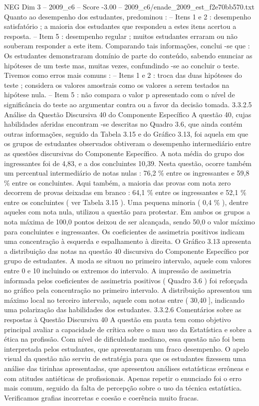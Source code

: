 \begin{textsample}{NEG Dim 3 – 2009\_c6 – Score -3.00 – 2009\_c6/enade\_2009\_est\_f2e70bb570.txt}
Quanto ao desempenho dos estudantes, predominou : – Itens 1 e 2 : desempenho satisfatório ; a maioria dos estudantes que respondeu a estes itens acertou a resposta. – Item 5 : desempenho regular ; muitos estudantes erraram ou não souberam responder a este item.
Comparando tais informações, conclui -se que : Os estudantes demonstraram domínio de parte do conteúdo, sabendo enunciar as hipóteses de um teste mas, muitas vezes, confundindo -se ao concluir o teste.
Tivemos como erros mais comuns : – Itens 1 e 2 : troca das duas hipóteses do teste ; considera os valores amostrais como os valores a serem testados na hipótese nula. – Item 5 : não compara o valor p apresentado com o nível de significância do teste ao argumentar contra ou a favor da decisão tomada. 3.3.2.5 Análise da Questão Discursiva 40 do Componente Específico A questão 40, cujas habilidades aferidas encontram -se descritas no Quadro 3.6, que ainda contém outras informações, seguido da Tabela 3.15 e do Gráfico 3.13, foi aquela em que os grupos de estudantes observados obtiveram o desempenho intermediário entre as questões discursivas do Componente Específico.
A nota média do grupo dos ingressantes foi de 4,83, e a dos concluintes 10,39.
Nesta questão, ocorre também um percentual intermediário de notas nulas : 76,2 \% entre os ingressantes e 59,8 \% entre os concluintes.
Aqui também, a maioria das provas com nota zero decorrem de provas deixadas em branco : 64,1 \% entre os ingressantes e 52,1 \% entre os concluintes ( ver Tabela 3.15 ).
Uma pequena minoria ( 0,4 \% ), dentre aqueles com nota nula, utilizou a questão para protestar.
Em ambos os grupos a nota máxima de 100,0 pontos deixou de ser alcançada, sendo 50,0 o valor máximo para concluintes e ingressantes.
Os coeficientes de assimetria positivos indicam uma concentração à esquerda e espalhamento à direita.
O Gráfico 3.13 apresenta a distribuição das notas na questão 40 discursiva do Componente Específico por grupo de estudantes.
A moda se situou no primeiro intervalo, aquele com valores entre 0 e 10 incluindo os extremos do intervalo.
A impressão de assimetria informada pelos coeficientes de assimetria positivos ( Quadro 3.6 ) foi reforçada no gráfico pela concentração no primeiro intervalo.
A distribuição apresentou um máximo local no terceiro intervalo, aquele com notas entre ( 30,40 ], indicando uma polarização das habilidades dos estudantes. 3.3.2.6 Comentários sobre as respostas à Questão Discursiva 40 A questão em pauta tem como objetivo principal avaliar a capacidade de crítica sobre o mau uso da Estatística e sobre a ética na profissão.
Com nível de dificuldade mediano, essa questão não foi bem interpretada pelos estudantes, que apresentaram um fraco desempenho.
O apelo visual da questão não serviu de estratégia para que os estudantes fizessem uma análise das tirinhas apresentadas, que apresentou análises estatísticas errôneas e com atitudes antiéticas de profissionais.
Apenas repetir o enunciado foi o erro mais comum, seguido da falta de percepção sobre o uso da técnica estatística.
Verificamos grafias incorretas e coesão e coerência muito fracas.

\end{textsample}
